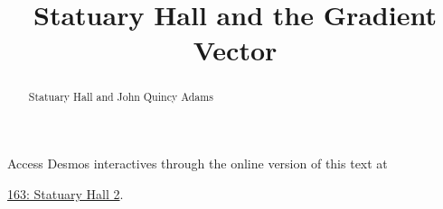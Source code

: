 \documentclass{ximera}
\title{Statuary Hall and the Gradient Vector}
\begin{document}
\begin{abstract}
Statuary Hall and John Quincy Adams
\end{abstract}
\maketitle


\begin{question}  \label{Q656g5y4546}


\begin{onlineOnly}
    \begin{center}
\end{center}
\end{onlineOnly}

Access Desmos interactives through the online version of this text at
 
\href{https://www.desmos.com/3d/3inyk1dxv4}{163: Statuary Hall 2}.

\end{question}
\end{document}
